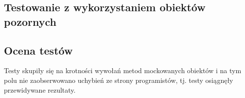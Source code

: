 \subsection{Testowanie z wykorzystaniem obiektów pozornych}

\subsection{Ocena testów}

Testy skupiły się na krotności wywołań metod mockowanych obiektów i
na tym polu nie zaobserwowano uchybień ze strony programistów, tj.
testy osiągnęły przewidywane rezultaty.
